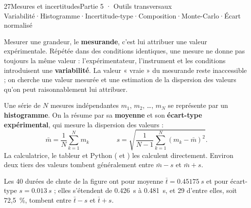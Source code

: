 \begin{ouverture}[mesure]{27}{Mesures et incertitudes}{Partie 5 · Outils transversaux}
{Variabilité\enspace·\enspace Histogramme\enspace·\enspace Incertitude-type\enspace·\enspace Composition\enspace·\enspace Monte-Carlo\enspace·\enspace Écart normalisé}
\end{ouverture}
\essentiel
{}
\begin{definition}
Mesurer une grandeur, le \textbf{mesurande}, c'est lui attribuer une valeur expérimentale. Répétée dans des conditions
identiques, une mesure ne donne pas toujours la même valeur : l'expérimentateur, l'instrument et les conditions
introduisent une \textbf{variabilité}. La valeur « vraie » du mesurande reste inaccessible ; on cherche une valeur
mesurée et une estimation de la dispersion des valeurs qu'on peut raisonnablement lui attribuer.
\end{definition}
\begin{propriete}
Une série de $N$ mesures indépendantes $m_1$, $m_2$, \ldots, $m_N$ se représente par un \textbf{histogramme}. On la résume par
sa \textbf{moyenne} et son \textbf{écart-type expérimental}, qui mesure la dispersion des valeurs :
\[\bar m=\frac{1}{N}\sum_{k=1}^{N}m_k\qquad\qquad s=\sqrt{\frac{1}{N-1}\sum_{k=1}^{N}\left(m_k-\bar m\right)^2}.\]
La calculatrice, le tableur et Python ( et ) les calculent directement. Environ deux tiers des
valeurs tombent généralement entre $\bar m-s$ et $\bar m+s$.
\end{propriete}
\begin{exemple}
Les 40 durées de chute de la figure ont pour moyenne $\bar t=\qty{0,45175}{s}$ et pour écart-type $s=\qty{0,013}{s}$ ; elles
s'étendent de \qty{0,426}{s} à \qty{0,481}{s}, et 29 d'entre elles, soit 72,5~\%, tombent entre $\bar t-s$ et $\bar t+s$.
\end{exemple}

